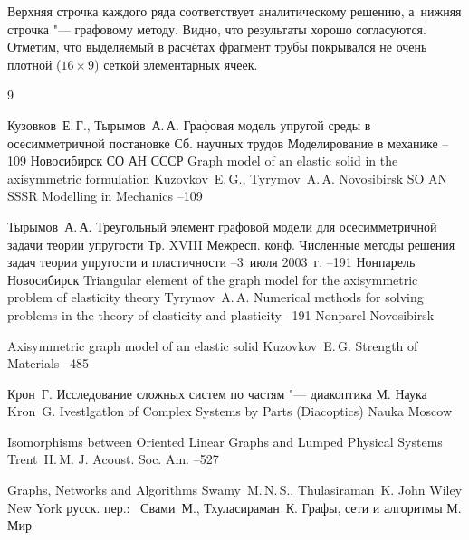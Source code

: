 Верхняя строчка каждого ряда соответствует аналитическому решению, а~нижняя строчка "--- графовому методу. 
Видно, что результаты хорошо согласуются. Отметим, что выделяемый в расчётах фрагмент трубы покрывался не очень плотной ($16\times9$) сеткой элементарных ячеек.






\begin{thebibliography}{9}

\by Кузовков~Е.\,Г., Тырымов~А.\,А.
\paper Графовая модель упругой среды в осесимметричной постановке
\bookinfo Сб. научных трудов
\inbook Моделирование в механике
--109
\publ Новосибирск
\publaddr СО АН СССР
\misctransl
\paper Graph model of an elastic solid in the axisymmetric formulation
\by Kuzovkov~E.\,G., Tyrymov~A.\,A.
\publ Novosibirsk
\publaddr SO AN SSSR
\inbook Modelling in Mechanics
--109


\by Тырымов~А.\,А.
\paper Треугольный элемент графовой модели для осесимметричной задачи теории упругости
\bookinfo Тр. XVIII Межресп. конф.
\inbook Численные методы решения задач теории упругости и пластичности
--3~июля 2003~г.
--191
\publ Нонпарель
\publaddr Новосибирск
\misctransl
\paper  Triangular element of the graph model for the axisymmetric problem of elasticity theory
\by Tyrymov~A.\,A.
\inbook Numerical methods for solving problems in the theory of elasticity and plasticity
--191
\publ Nonparel 
\publaddr Novosibirsk


\paper Axisymmetric graph model of an elastic solid
\by Kuzovkov~E.\,G.
\jour Strength of Materials
--485

\by Крон~Г.
\book Исследование сложных систем по частям "--- диакоптика
\publaddr М.
\publ Наука
\misctransl
\by Kron~G.
\book Ivestlgatlon  of Complex Systems by Parts (Diacoptics)
\publ Nauka
\publaddr Moscow


\paper Isomorphisms between Oriented Linear Graphs and Lumped Physical Systems
\by Trent~H.\,M.
\jour J. Acoust. Soc. Am.
--527

\book Graphs, Networks and Algorithms
\by  Swamy~M.\,N.\,S.,  Thulasiraman~K.
\publ John Wiley
\publaddr New York
\rtransl русск. пер.:~
\by Свами~М., Тхуласираман~К.
\book Графы, сети и алгоритмы
\publaddr М.
\publ Мир



\end{thebibliography}

